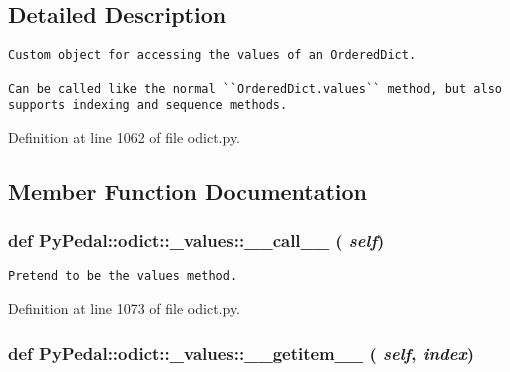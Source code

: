\subsection{Detailed Description}


\footnotesize\begin{verbatim}
Custom object for accessing the values of an OrderedDict.

Can be called like the normal ``OrderedDict.values`` method, but also
supports indexing and sequence methods.
\end{verbatim}
\normalsize
 

Definition at line 1062 of file odict.py.

\subsection{Member Function Documentation}
\hypertarget{classPyPedal_1_1odict_1_1__values_eeb381aa8f439bf3f062490ffb57abdf}{
\subsubsection{\setlength{\rightskip}{0pt plus 5cm}def PyPedal::odict::\_\-values::\_\-\_\-call\_\-\_\- ( {\em self})}}
\label{classPyPedal_1_1odict_1_1__values_eeb381aa8f439bf3f062490ffb57abdf}




\footnotesize\begin{verbatim}Pretend to be the values method.\end{verbatim}
\normalsize
 

Definition at line 1073 of file odict.py.\hypertarget{classPyPedal_1_1odict_1_1__values_a8d80e1fb2e909bacb2f44d478919d13}{
\subsubsection{\setlength{\rightskip}{0pt plus 5cm}def PyPedal::odict::\_\-values::\_\-\_\-getitem\_\-\_\- ( {\em self}, \/   {\em index})}}
\label{classPyPedal_1_1odict_1_1__values_a8d80e1fb2e909bacb2f44d478919d13}




